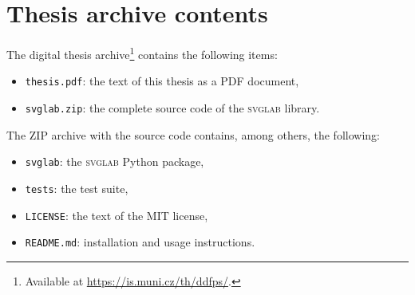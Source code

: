 \chapter{Thesis archive contents}\label{appx:source}

The digital thesis archive\footnote{Available at \url{https://is.muni.cz/th/ddfps/}.} contains the following items:

\begin{itemize}
    \item \texttt{thesis.pdf}: the text of this thesis as a PDF document,
    \item \texttt{svglab.zip}: the complete source code of the \textsc{svglab} library.
\end{itemize}

The ZIP archive with the source code contains, among others, the following:
\begin{itemize}
    \item \texttt{svglab}: the \textsc{svglab} Python package,
    \item \texttt{tests}: the test suite,
    \item \texttt{LICENSE}: the text of the MIT license,
    \item \texttt{README.md}: installation and usage instructions.
\end{itemize}
